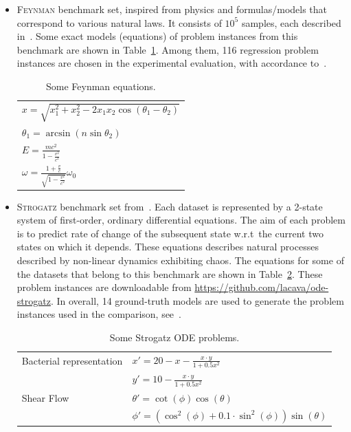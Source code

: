 \documentclass[a4paper,12pt]{elsarticle}
\begin{document}
\begin{itemize}
	\item \textsc{Feynman} benchmark set, inspired from physics and formulas/models that correspond to various natural laws.  
	It consists of $10^5$  samples, each described in~\cite{udrescu2020ai}. Some exact models (equations) of problem instances from this benchmark are shown in Table~\ref{tab:Feynamn-Eq}.  Among them, 116 regression problem instances are chosen in the experimental evaluation, with accordance to~\cite{la2021contemporary}. 
	
	\begin{table}[!ht]
		\centering
		\begin{tabular}{l}   \hline
			$x = \sqrt{x_1^2 + x_2^2 - 2 x_1 x_2 \cos(\theta_1 - \theta_2)}$ \\
			$ \theta_1 = \arcsin(n \sin \theta_2)$ \\
			$E =  \frac{m c^2 }{1 - \frac{v^2}{c^2}}$ \\
			$\omega = \frac{1 + \frac{v}{c}}{ \sqrt{1 - \frac{v^2}{c^2}}} \omega_0$ \\ \hline
			
		\end{tabular}
		\caption{Some Feynman equations.}
		\label{tab:Feynamn-Eq}
	\end{table}
	
	
	\item \textsc{Strogatz} benchmark set from~\cite{la2016inference}. 
	Each dataset is represented by a 2-state system of first-order, ordinary differential equations. 
	The aim of each problem is to predict rate of change of the subsequent state w.r.t\  the current two states on which it depends. These equations describes natural processes described by non-linear dynamics  exhibiting chaos.  The equations for some of the datasets that belong to this benchmark are shown in Table~\ref{table:strogatz-ODEs}. These problem instances are downloadable from \url{https://github.com/lacava/ode-strogatz}. In overall, 14 ground-truth models are used to generate the problem instances used in the comparison, see~\cite{la2021contemporary}. 
	
	
	\begin{table}
		\centering
		\begin{tabular}{ll} \\ \hline
			Bacterial representation &   $x' = 20 - x - \frac{x \cdot y}{1 + 0.5 x^2 }$ \\ 
			&   $y' = 10 - \frac{x \cdot y}{1 + 0.5 x^2  }$ \\ \hline
			Shear Flow               &  $\theta' = \cot(\phi)\cos(\theta)$ \\
			&  $ \phi'  = ( \cos^2(\phi) + 0.1 \cdot \sin^2 (\phi)) \sin(\theta) $ \\ \hline
		\end{tabular}
		\caption{Some Strogatz ODE problems.}
		\label{table:strogatz-ODEs}
	\end{table}
	
	
\end{itemize}
\end{document}

